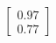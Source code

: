\documentclass[preview]{standalone}
\begin{document}
\begin{align*}
\begin{bmatrix} 0.97 \\ 0.77 \end{bmatrix}
\end{align*}
\end{document}
